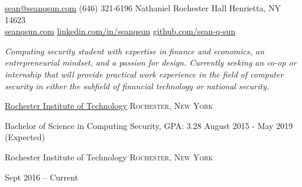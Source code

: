 \documentclass[10pt,a4paper]{article}
\begin{document}
\sloppy 



\nobreakvspace{0.3em}  %

\noindent\href{mailto:sean.at.seanqsun.dot.com}{sean\mbox{}@\mbox{}seanqsun.com}\sbull
(646) 321-6196 Nathaniel Rochester Hall Henrietta, NY 14623
\\
\noindent\href{http://www.seanqsun.com}{seanqsun.com}\sbull
\href{http://www.linkedin.com/in/seanqsun}{linkedin.com/in/seanqsun}\sbull
\href{https://www.github.com/sean-q-sun}{github.com/sean-q-sun}

\spacedhrule{0.2em}{-0.4em}  %

\noindent \emph{Computing security student with expertise in finance and economics, an entrepreneurial mindset, and a passion for design. Currently seeking an co-op or internship that will provide practical work experience in the field of computer security in either the subfield of financial technology or national security.}

\spacedhrule{0.2em}{-0.4em}


\headedsection
  {\href{https://www.rit.edu/gccis/computingsecurity/}{Rochester Institute of Technology}}
  {\textsc{Rochester, New York}} {
  \headedsubsection
    {Bachelor of Science in Computing Security, GPA: 3.28}
    {August 2015 - May 2019 (Expected)} 

}

\spacedhrule{0em}{-0.4em}


\headedsection  %
  {Rochester Institute of Technology}
  {\textsc{Rochester, New York}} {
    {}
    {Sept 2016 -- Current}
    {}


}
\end{document}
